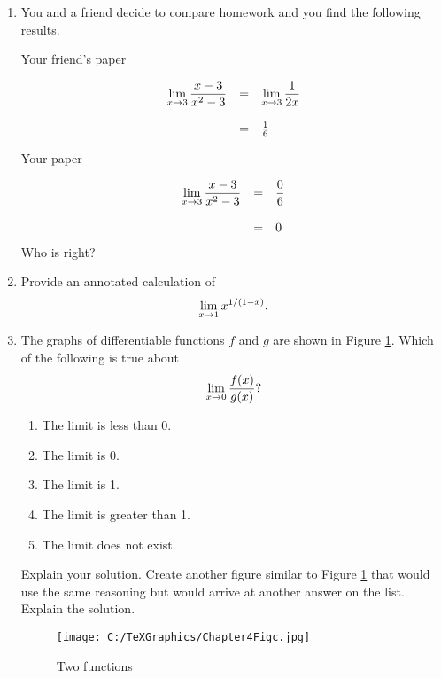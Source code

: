 \section{}
\begin{enumerate}%

\item  You and a friend decide to compare homework and you find the following results.
\begin{center}{Your friend's paper}\end{center}
	$$\begin{array}{rcl}  \displaystyle{\mathop {\lim }\limits_{x \to 3} {{x - 3} \over {x^2  - 3}}}& = &\displaystyle{\mathop {\lim }\limits_{x \to 3} {1 \over {2x}}} \cr  \mbox{}&&\cr  &= &{1 \over 6} \cr \end{array}$$

\begin{center}Your paper\end{center}
$$\begin{array}{rcl}  \displaystyle{\mathop {\lim }\limits_{x \to 3} {{x - 3} \over {x^2  - 3}}} &=& \displaystyle{{0 \over 6}} \cr   \mbox{}&&\cr  &=& 0 \cr\end{array} $$
Who is right?  \cite{FWG}

\item Provide an annotated calculation of $$
\mathop {\lim }\limits_{x \to 1} x^{{1 \mathord{\left/
 {\vphantom {1 {(1 - x)}}} \right.
 \kern-\nulldelimiterspace} {(1 - x)}}} .
$$

\item  The graphs of differentiable functions $f$ and $g$ are shown in Figure \ref{Chapter4Figurec}.  Which of the following is true about $$\mathop {\lim }\limits_{x \to 0} {{f(x)} \over {g(x)}}?$$ \begin{enumerate}\item The limit is less than 0.  \item   The limit is 0.  
\item The limit is 1. \item The limit is greater than 1.  \item The limit does not exist. \end{enumerate}
Explain your solution.  Create another figure similar to Figure \ref{Chapter4Figurec} that would use the same reasoning but would arrive at another answer on the list.  Explain the solution.

\begin{figure}[ht]
	\centering
		\texttt{[image: C:/TeXGraphics/Chapter4Figc.jpg]}
	\caption{Two functions}
	\label{Chapter4Figurec}
\end{figure}




\end{enumerate}

